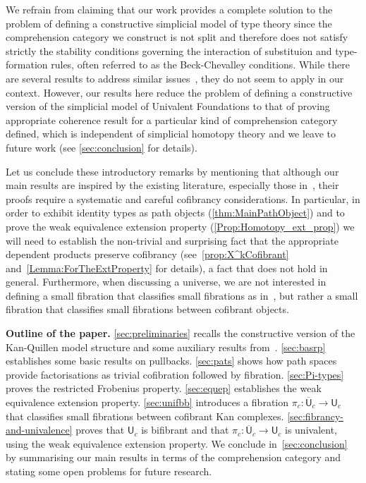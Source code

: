 \documentclass[reqno,10pt,a4paper,oneside,draft]{amsart}
\numberwithin{equation}{section}
\theoremstyle{mythm}
\theoremstyle{mydef}
\theoremstyle{myrmk}
\newcommand{\co}{\colon}
\newcommand{\UU}{\overline{\mathsf{U}}}
\newcommand{\U}{\mathsf{U}}
\begin{document}
We refrain from claiming that our work provides a complete solution to the problem of defining a constructive simplicial model of type theory since the comprehension category we construct is not split and therefore does not
satisfy strictly the stability conditions governing the interaction of substituion and type-formation rules, often
referred to as the Beck-Chevalley conditions. While there are several results to address similar issues~\cite{clairambaultdybjer2014,HofmannM:intttl,voevodsky-simplicial-model,LumsdaineP:locuoc,ShulmanM:allths}, they do not seem to apply in our  context. However, our results here reduce the problem of defining a constructive version of the simplicial model of Univalent Foundations to that of proving appropriate coherence result for a particular kind of 
comprehension category defined, which is independent of simplicial homotopy theory  and we leave to future work (see \cref{sec:conclusion} for
details).

Let us conclude these introductory remarks by mentioning that although our main results are inspired by the existing literature, especially those in~\cite{voevodsky-simplicial-model}, their proofs require a systematic and careful cofibrancy considerations. In particular, in order to 
exhibit identity types as path objects (\cref{thm:MainPathObject}) and to prove the weak equivalence
extension property (\cref{Prop:Homotopy_ext_prop}) we will need to establish the non-trivial
and surprising fact that the appropriate dependent products preserve cofibrancy (see~\cref{prop:X^kCofibrant} and~\cref{Lemma:ForTheExtProperty} for details), a 
fact that does not hold in general. Furthermore, when discussing a universe, we are not interested in defining a small fibration that classifies small fibrations as in~\cite{voevodsky-simplicial-model}, but
rather a small fibration that classifies small fibrations between cofibrant objects. 




\smallskip

\noindent 
\textbf{Outline of the paper.} \cref{sec:preliminaries} recalls the constructive version of the 
Kan-Quillen model structure and some auxiliary results from~\cite{henry2019qms}. \cref{sec:basrp} establishes some basic results on pullbacks. \cref{sec:pats} shows how path spaces provide factorisations
as trivial cofibration followed by fibration. \cref{sec:Pi-types} proves the restricted Frobenius property. \cref{sec:equep}
establishes the weak equivalence extension property.
\cref{sec:unifbb} introduces a fibration $\pi_c \co \UU_c \to \U_c$ that classifies small fibrations
between cofibrant Kan complexes. \cref{sec:fibrancy-and-univalence} proves that $\U_c$ is bifibrant and that $\pi_c \co \UU_c \to \U_c$ is univalent, using the weak equivalence extension property.
We conclude in~\cref{sec:conclusion} by summarising our main results in terms of
the comprehension category and stating some open problems for future research.
\end{document}

